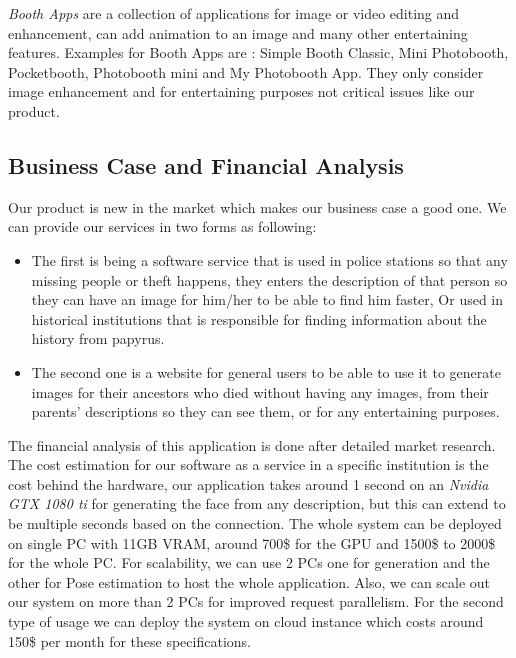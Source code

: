 \emph{Booth Apps} are a collection of applications for image or video editing and enhancement, can add animation to an image and many other entertaining features. Examples for Booth Apps are : Simple Booth Classic, Mini Photobooth, Pocketbooth, Photobooth mini and My Photobooth App.
They only consider image enhancement and for entertaining purposes not critical issues like our product.

\subsection{Business Case and Financial Analysis }

Our product is new in the market which makes our business case a good one. We can provide our services in two forms as following:
\begin{itemize}
    \item The first is being a software service that is used in police stations so that any missing people or theft happens, they enters the description of that person so they can have an image for him/her to be able to find him faster, Or used in historical institutions that is responsible for finding information about the history from papyrus.
    \item The second one is a website for general users to be able to use it to generate images for their ancestors who died without having any images, from their parents' descriptions so they can see them, or for any entertaining purposes.
\end{itemize}

The financial analysis of this application is done after detailed market research.
The cost estimation for our software as a service in a specific institution is the cost behind the hardware, our application takes around 1 second on an \emph{Nvidia GTX 1080 ti} for generating the face from any description, but this can extend to be multiple seconds based on the connection. The whole system can be deployed on single PC with 11GB VRAM, around 700\$ for the GPU and 1500\$ to 2000\$ for the whole PC. For scalability, we can use 2 PCs one for generation and the other for Pose estimation to host the whole application. Also, we can scale out our system on more than 2 PCs for improved request parallelism. For the second type of usage we can deploy the system on cloud instance which costs around 150\$ per month for these specifications.
